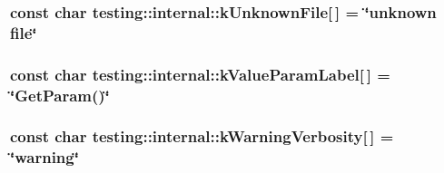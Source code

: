 \subsubsection[{\texorpdfstring{k\+Unknown\+File}{kUnknownFile}}]{\setlength{\rightskip}{0pt plus 5cm}const char testing\+::internal\+::k\+Unknown\+File\mbox{[}$\,$\mbox{]} = \char`\"{}unknown file\char`\"{}}\hypertarget{namespacetesting_1_1internal_abae7a5775c901f2fd12b058b00d09840}{}\label{namespacetesting_1_1internal_abae7a5775c901f2fd12b058b00d09840}
\subsubsection[{\texorpdfstring{k\+Value\+Param\+Label}{kValueParamLabel}}]{\setlength{\rightskip}{0pt plus 5cm}const char testing\+::internal\+::k\+Value\+Param\+Label\mbox{[}$\,$\mbox{]} = \char`\"{}Get\+Param()\char`\"{}\hspace{0.3cm}{\ttfamily [static]}}\hypertarget{namespacetesting_1_1internal_ae57eee0bf5371ff8e9688fb4464bc62b}{}\label{namespacetesting_1_1internal_ae57eee0bf5371ff8e9688fb4464bc62b}
\subsubsection[{\texorpdfstring{k\+Warning\+Verbosity}{kWarningVerbosity}}]{\setlength{\rightskip}{0pt plus 5cm}const char testing\+::internal\+::k\+Warning\+Verbosity\mbox{[}$\,$\mbox{]} = \char`\"{}warning\char`\"{}}\hypertarget{namespacetesting_1_1internal_ad9386ccda6b6deac2f7b84784d3088c0}{}\label{namespacetesting_1_1internal_ad9386ccda6b6deac2f7b84784d3088c0}
